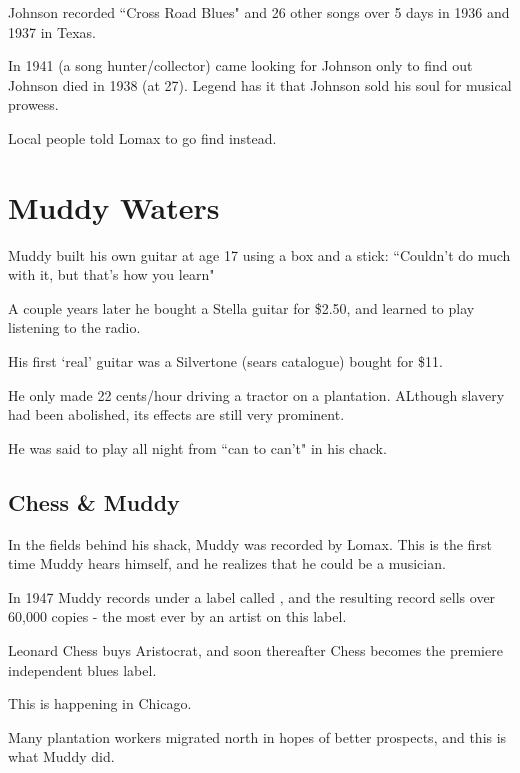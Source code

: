\documentclass[12pt, a4paper, twoside, openright, titlepage]{book}
\begin{document}
\begin{rmk}{}{}
    Johnson recorded ``Cross Road Blues" and 26 other songs over 5 days in 1936 and 1937 in Texas.
\end{rmk}


In 1941  (a song hunter/collector) came looking for Johnson only to find out Johnson died in 1938 (at 27). Legend has it that Johnson sold his soul for musical prowess.

Local people told Lomax to go find  instead.

\section{Muddy Waters}

Muddy built his own guitar at age 17 using a box and a stick: ``Couldn't do much with it, but that's how you learn"


A couple years later he bought a Stella guitar for \$2.50, and learned to play listening to the radio.


His first `real' guitar was a Silvertone (sears catalogue) bought for \$11.

\begin{note}{}{}
    He only made 22 cents/hour driving a tractor on a plantation. ALthough slavery had been abolished, its effects are still very prominent.
\end{note}

\begin{rmk}{}{}
    He was said to play all night from ``can to can't" in his chack.
\end{rmk}


\subsection{Chess \& Muddy}

In the fields behind his shack, Muddy was recorded by Lomax. This is the first time Muddy hears himself, and he realizes that he could be a musician.


In 1947 Muddy records under a label called , and the resulting record sells over 60,000 copies - the most ever by an artist on this label.

Leonard Chess buys Aristocrat, and soon thereafter Chess becomes the premiere independent blues label.

\begin{note}{}{}
    This is happening in Chicago.

    Many plantation workers migrated north in hopes of better prospects, and this is what Muddy did.
\end{note}
\end{document}
